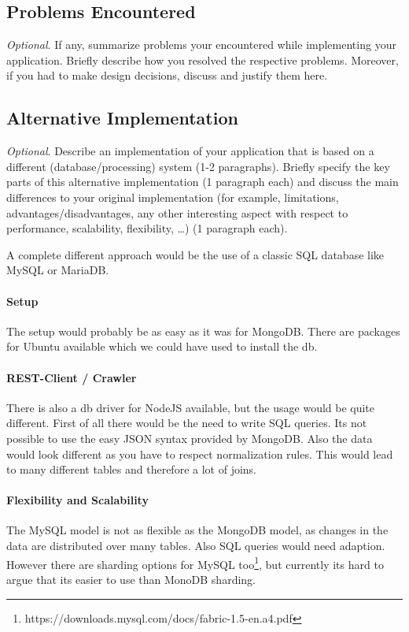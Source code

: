 \subsection{Problems Encountered}

\emph{Optional}. If any, summarize problems your encountered while implementing
your application. Briefly describe how you resolved the respective problems.
Moreover, if you had to make design decisions, discuss and justify them here.

\subsection{Alternative Implementation}

\emph{Optional}. Describe an implementation of your application that is based on
a different (database/processing) system (1-2 paragraphs). Briefly specify the
key parts of this alternative implementation (1 paragraph each) and discuss the
main differences to your original implementation (for example, limitations,
advantages/disadvantages, any other interesting aspect with respect to
performance, scalability, flexibility, \ldots) (1 paragraph each).

A complete different approach would be the use of a classic SQL database like MySQL or MariaDB.

\paragraph{Setup}
The setup would probably be as easy as it was for MongoDB. There are packages for Ubuntu available which we could have used to install the db.

\paragraph{REST-Client / Crawler}
There is also a db driver for NodeJS available, but the usage would be quite different. First of all there would be the need to write SQL queries. Its not possible to use the easy JSON syntax provided by MongoDB. Also the data would look different as you have to respect normalization rules. This would lead to many different tables and therefore a lot of joins.

\paragraph{Flexibility and Scalability}
The MySQL model is not as flexible as the MongoDB model, as changes in the data are distributed over many tables. Also SQL queries would need adaption. However there are sharding options for MySQL too\footnote{https://downloads.mysql.com/docs/fabric-1.5-en.a4.pdf}, but currently its hard to argue that its easier to use than MonoDB sharding. 
